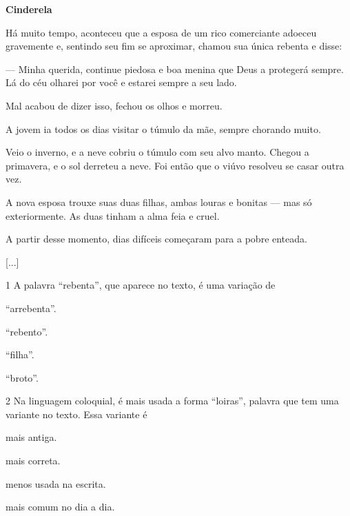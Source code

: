 \begin{myquote}
\textbf{Cinderela}

Há muito tempo, aconteceu que a esposa de um rico
comerciante adoeceu gravemente e, sentindo seu fim se
aproximar, chamou sua única rebenta e disse:

--- Minha querida, continue piedosa e boa menina que
Deus a protegerá sempre. Lá do céu olharei por você e estarei
sempre a seu lado.

Mal acabou de dizer isso, fechou os olhos e morreu.

A jovem ia todos os dias visitar o túmulo da mãe,
sempre chorando muito.

Veio o inverno, e a neve cobriu o túmulo com seu alvo
manto. Chegou a primavera, e o sol derreteu a neve. Foi então
que o viúvo resolveu se casar outra vez.

A nova esposa trouxe suas duas filhas, ambas louras e
bonitas --- mas só exteriormente. As duas tinham a alma feia
e cruel.

A partir desse momento, dias difíceis começaram para
a pobre enteada.

{[}...{]}

\end{myquote}

\num{1} A palavra ``rebenta'', que aparece no texto, é uma variação de

\begin{escolha}[itemsep=-5pt]
\item ``arrebenta''.

\item ``rebento''.

\item ``filha''.

\item ``broto''.
\end{escolha}

\num{2} Na linguagem coloquial, é mais usada a forma ``loiras'', palavra que tem uma variante no texto. Essa variante é

\begin{escolha}[itemsep=-5pt]
\item mais antiga.

\item mais correta.

\item menos usada na escrita.

\item mais comum no dia a dia.
\end{escolha}

